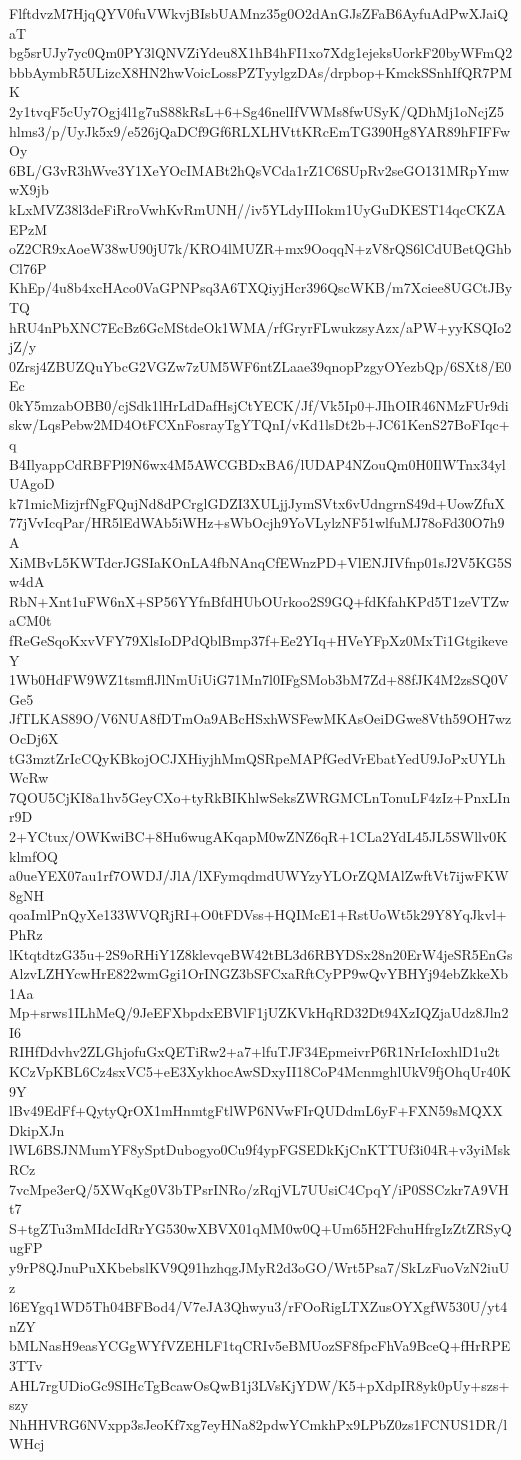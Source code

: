 FlftdvzM7HjqQYV0fuVWkvjBIsbUAMnz35g0O2dAnGJsZFaB6AyfuAdPwXJaiQaT
bg5srUJy7yc0Qm0PY3lQNVZiYdeu8X1hB4hFI1xo7Xdg1ejeksUorkF20byWFmQ2
bbbAymbR5ULizcX8HN2hwVoicLossPZTyylgzDAs/drpbop+KmckSSnhIfQR7PMK
2y1tvqF5cUy7Ogj4l1g7uS88kRsL+6+Sg46nelIfVWMs8fwUSyK/QDhMj1oNcjZ5
hlms3/p/UyJk5x9/e526jQaDCf9Gf6RLXLHVttKRcEmTG390Hg8YAR89hFIFFwOy
6BL/G3vR3hWve3Y1XeYOcIMABt2hQsVCda1rZ1C6SUpRv2seGO131MRpYmwwX9jb
kLxMVZ38l3deFiRroVwhKvRmUNH//iv5YLdyIIIokm1UyGuDKEST14qcCKZAEPzM
oZ2CR9xAoeW38wU90jU7k/KRO4lMUZR+mx9OoqqN+zV8rQS6lCdUBetQGhbCl76P
KhEp/4u8b4xcHAco0VaGPNPsq3A6TXQiyjHcr396QscWKB/m7Xciee8UGCtJByTQ
hRU4nPbXNC7EcBz6GcMStdeOk1WMA/rfGryrFLwukzsyAzx/aPW+yyKSQIo2jZ/y
0Zrsj4ZBUZQuYbcG2VGZw7zUM5WF6ntZLaae39qnopPzgyOYezbQp/6SXt8/E0Ec
0kY5mzabOBB0/cjSdk1lHrLdDafHsjCtYECK/Jf/Vk5Ip0+JIhOIR46NMzFUr9di
skw/LqsPebw2MD4OtFCXnFosrayTgYTQnI/vKd1lsDt2b+JC61KenS27BoFIqc+q
B4IlyappCdRBFPl9N6wx4M5AWCGBDxBA6/lUDAP4NZouQm0H0IlWTnx34ylUAgoD
k71micMizjrfNgFQujNd8dPCrglGDZI3XULjjJymSVtx6vUdngrnS49d+UowZfuX
77jVvIcqPar/HR5lEdWAb5iWHz+sWbOcjh9YoVLylzNF51wlfuMJ78oFd30O7h9A
XiMBvL5KWTdcrJGSIaKOnLA4fbNAnqCfEWnzPD+VlENJIVfnp01sJ2V5KG5Sw4dA
RbN+Xnt1uFW6nX+SP56YYfnBfdHUbOUrkoo2S9GQ+fdKfahKPd5T1zeVTZwaCM0t
fReGeSqoKxvVFY79XlsIoDPdQblBmp37f+Ee2YIq+HVeYFpXz0MxTi1GtgikeveY
1Wb0HdFW9WZ1tsmflJlNmUiUiG71Mn7l0IFgSMob3bM7Zd+88fJK4M2zsSQ0VGe5
JfTLKAS89O/V6NUA8fDTmOa9ABcHSxhWSFewMKAsOeiDGwe8Vth59OH7wzOcDj6X
tG3mztZrIcCQyKBkojOCJXHiyjhMmQSRpeMAPfGedVrEbatYedU9JoPxUYLhWcRw
7QOU5CjKI8a1hv5GeyCXo+tyRkBIKhlwSeksZWRGMCLnTonuLF4zIz+PnxLInr9D
2+YCtux/OWKwiBC+8Hu6wugAKqapM0wZNZ6qR+1CLa2YdL45JL5SWllv0KklmfOQ
a0ueYEX07au1rf7OWDJ/JlA/lXFymqdmdUWYzyYLOrZQMAlZwftVt7ijwFKW8gNH
qoaImlPnQyXe133WVQRjRI+O0tFDVss+HQIMcE1+RstUoWt5k29Y8YqJkvl+PhRz
lKtqtdtzG35u+2S9oRHiY1Z8klevqeBW42tBL3d6RBYDSx28n20ErW4jeSR5EnGs
AlzvLZHYcwHrE822wmGgi1OrINGZ3bSFCxaRftCyPP9wQvYBHYj94ebZkkeXb1Aa
Mp+srws1ILhMeQ/9JeEFXbpdxEBVlF1jUZKVkHqRD32Dt94XzIQZjaUdz8Jln2I6
RIHfDdvhv2ZLGhjofuGxQETiRw2+a7+lfuTJF34EpmeivrP6R1NrIcIoxhlD1u2t
KCzVpKBL6Cz4sxVC5+eE3XykhocAwSDxyII18CoP4McnmghlUkV9fjOhqUr40K9Y
lBv49EdFf+QytyQrOX1mHnmtgFtlWP6NVwFIrQUDdmL6yF+FXN59sMQXXDkipXJn
lWL6BSJNMumYF8ySptDubogyo0Cu9f4ypFGSEDkKjCnKTTUf3i04R+v3yiMskRCz
7vcMpe3erQ/5XWqKg0V3bTPsrINRo/zRqjVL7UUsiC4CpqY/iP0SSCzkr7A9VHt7
S+tgZTu3mMIdcIdRrYG530wXBVX01qMM0w0Q+Um65H2FchuHfrgIzZtZRSyQugFP
y9rP8QJnuPuXKbebslKV9Q91hzhqgJMyR2d3oGO/Wrt5Psa7/SkLzFuoVzN2iuUz
l6EYgq1WD5Th04BFBod4/V7eJA3Qhwyu3/rFOoRigLTXZusOYXgfW530U/yt4nZY
bMLNasH9easYCGgWYfVZEHLF1tqCRIv5eBMUozSF8fpcFhVa9BceQ+fHrRPE3TTv
AHL7rgUDioGc9SIHcTgBcawOsQwB1j3LVsKjYDW/K5+pXdpIR8yk0pUy+szs+szy
NhHHVRG6NVxpp3sJeoKf7xg7eyHNa82pdwYCmkhPx9LPbZ0zs1FCNUS1DR/lWHcj
